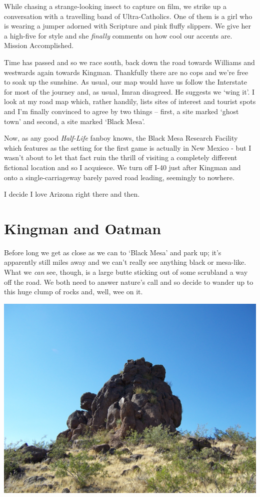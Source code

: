 \documentclass[a5paper,titlepage,11pt,draft]{book}
\begin{document}
While chasing a strange-looking insect to capture on film, we strike up a conversation with a travelling band of Ultra-Catholics.  One of them is a girl who is wearing a jumper adorned with Scripture and pink fluffy slippers.  We give her a high-five for style and she \emph{finally} comments on how cool our accents are.  Mission Accomplished.

Time has passed and so we race south, back down the road towards Williams and westwards again towards Kingman.  Thankfully there are no cops and we're free to soak up the sunshine.  As usual, our map would have us follow the Interstate for most of the journey and, as usual, Imran disagreed.  He suggests we `wing it'.  I look at my road map which, rather handily, lists sites of interest and tourist spots and I'm finally convinced to agree by two things -- first, a site marked `ghost town' and second, a site marked `Black Mesa'.

Now, as any good \emph{Half-Life} fanboy knows, the Black Mesa Research Facility which features as the setting for the first game is actually in New Mexico - but I wasn't about to let that fact ruin the thrill of visiting a completely different fictional location and so I acquiesce.  We turn off I-40 just after Kingman and onto a single-carriageway barely paved road leading, seemingly to nowhere.

I decide I love Arizona right there and then.

\section*{Kingman and Oatman}

Before long we get as close as we can to `Black Mesa' and park up; it's apparently still miles away and we can't really see anything black or mesa-like.  What we \emph{can} see, though, is a large butte sticking out of some scrubland a way off the road.  We both need to answer nature's call and so decide to wander up to this huge clump of rocks and, well, wee on it.

\begin{center}\includegraphics[width=\textwidth]{gfx/100_1521}\end{center}
\end{document}

